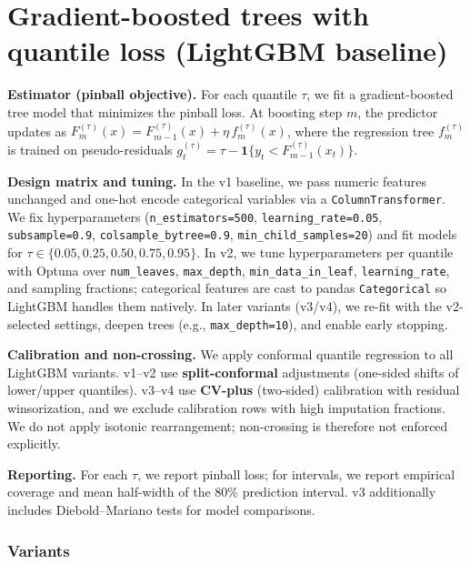 \documentclass[
  a4paper,
  DIV=11,
  numbers=noendperiod]{scrreprt}
\begin{document}
\section{Gradient-boosted trees with quantile loss (LightGBM
baseline)}\label{sec-lgbm}

\textbf{Estimator (pinball objective).} For each quantile \(\tau\), we
fit a gradient-boosted tree model that minimizes the pinball loss. At
boosting step \(m\), the predictor updates as
\(F^{(\tau)}_{m}(x) = F^{(\tau)}_{m-1}(x) + \eta\,f^{(\tau)}_{m}(x)\),
where the regression tree \(f^{(\tau)}_{m}\) is trained on
pseudo-residuals
\(g^{(\tau)}_{t} = \tau - \mathbf{1}\{y_t < F^{(\tau)}_{m-1}(x_t)\}\).

\textbf{Design matrix and tuning.} In the v1 baseline, we pass numeric
features unchanged and one-hot encode categorical variables via a
\texttt{ColumnTransformer}. We fix hyperparameters
(\texttt{n\_estimators=500}, \texttt{learning\_rate=0.05},
\texttt{subsample=0.9}, \texttt{colsample\_bytree=0.9},
\texttt{min\_child\_samples=20}) and fit models for
\(\tau\in\{0.05,0.25,0.50,0.75,0.95\}\). In v2, we tune hyperparameters
per quantile with Optuna over \texttt{num\_leaves}, \texttt{max\_depth},
\texttt{min\_data\_in\_leaf}, \texttt{learning\_rate}, and sampling
fractions; categorical features are cast to pandas \texttt{Categorical}
so LightGBM handles them natively. In later variants (v3/v4), we re-fit
with the v2-selected settings, deepen trees (e.g.,
\texttt{max\_depth=10}), and enable early stopping.

\textbf{Calibration and non-crossing.} We apply conformal quantile
regression to all LightGBM variants. v1--v2 use \textbf{split-conformal}
adjustments (one-sided shifts of lower/upper quantiles). v3--v4 use
\textbf{CV-plus} (two-sided) calibration with residual winsorization,
and we exclude calibration rows with high imputation fractions. We do
not apply isotonic rearrangement; non-crossing is therefore not enforced
explicitly.

\textbf{Reporting.} For each \(\tau\), we report pinball loss; for
intervals, we report empirical coverage and mean half-width of the 80\%
prediction interval. v3 additionally includes Diebold--Mariano tests for
model comparisons.

\subsubsection{Variants}\label{variants}
\end{document}

